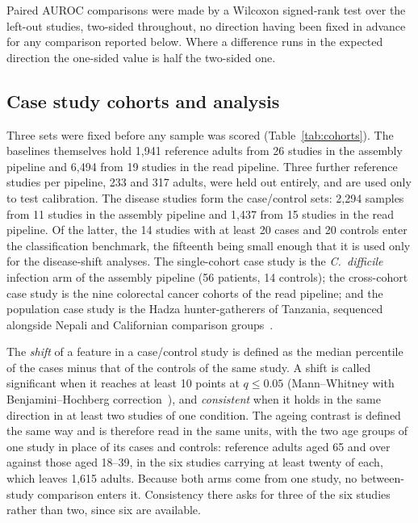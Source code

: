 \documentclass[conference]{IEEEtran}
\newcommand{\cdiff}{\textit{C.~difficile}}
\begin{document}
Paired AUROC comparisons were made by a Wilcoxon signed-rank test over the left-out studies, two-sided throughout, no direction having been fixed in advance for any comparison reported below. Where a difference runs in the expected direction the one-sided value is half the two-sided one.

\subsection{Case study cohorts and analysis}

Three sets were fixed before any sample was scored (Table~\ref{tab:cohorts}). The baselines themselves hold 1{,}941 reference adults from 26 studies in the assembly pipeline and 6{,}494 from 19 studies in the read pipeline. Three further reference studies per pipeline, 233 and 317 adults, were held out entirely, and are used only to test calibration. The disease studies form the case/control sets: 2{,}294 samples from 11 studies in the assembly pipeline and 1{,}437 from 15 studies in the read pipeline. Of the latter, the 14 studies with at least 20 cases and 20 controls enter the classification benchmark, the fifteenth being small enough that it is used only for the disease-shift analyses. The single-cohort case study is the \cdiff{} infection arm of the assembly pipeline (56 patients, 14 controls); the cross-cohort case study is the nine colorectal cancer cohorts of the read pipeline; and the population case study is the Hadza hunter-gatherers of Tanzania, sequenced alongside Nepali and Californian comparison groups~\cite{carter2023}.

The \emph{shift} of a feature in a case/control study is defined as the median percentile of the cases minus that of the controls of the same study. A shift is called significant when it reaches at least 10 points at $q \leq 0.05$ (Mann--Whitney with Benjamini--Hochberg correction~\cite{benjamini1995}), and \emph{consistent} when it holds in the same direction in at least two studies of one condition. The ageing contrast is defined the same way and is therefore read in the same units, with the two age groups of one study in place of its cases and controls: reference adults aged 65 and over against those aged 18--39, in the six studies carrying at least twenty of each, which leaves 1{,}615 adults. Because both arms come from one study, no between-study comparison enters it. Consistency there asks for three of the six studies rather than two, since six are available.
\end{document}
